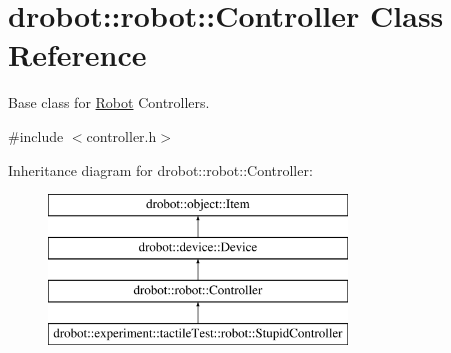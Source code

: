 \hypertarget{classdrobot_1_1robot_1_1Controller}{\section{drobot\-:\-:robot\-:\-:Controller Class Reference}
\label{classdrobot_1_1robot_1_1Controller}
}


Base class for \hyperlink{classdrobot_1_1robot_1_1Robot}{Robot} Controllers.  




{\ttfamily \#include $<$controller.\-h$>$}

Inheritance diagram for drobot\-:\-:robot\-:\-:Controller\-:\begin{figure}[H]
\begin{center}
\leavevmode
\includegraphics[height=4.000000cm]{classdrobot_1_1robot_1_1Controller}
\end{center}
\end{figure}

